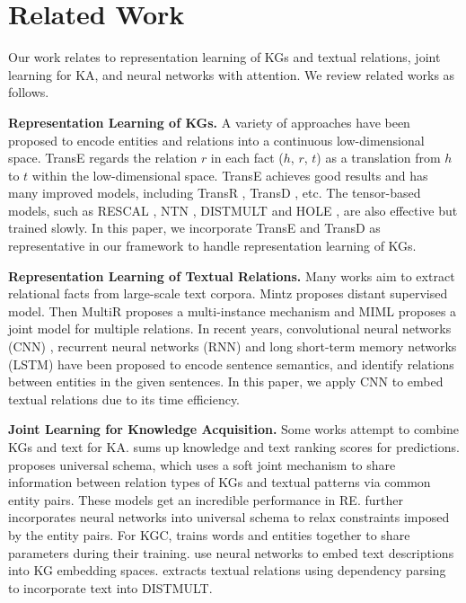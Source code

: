 \documentclass[letterpaper]{article} %
\begin{document}
\section{Related Work}
\label{sec:related}
Our work relates to representation learning of KGs and textual relations, joint learning for KA, and neural networks with attention. We review related works as follows.

\textbf{Representation Learning of KGs.} A variety of approaches have been proposed to encode entities and relations into a continuous low-dimensional space. TransE \cite{bordes2013translating} regards the relation $r$ in each fact ($h$, $r$, $t$) as a translation from $h$ to $t$ within the low-dimensional space. TransE achieves good results and has many improved models, including TransR \cite{lin2015learning}, TransD \cite{ji2015knowledge}, etc. The tensor-based models, such as RESCAL \cite{nickel2011three}, NTN \cite{socher2013reasoning}, DISTMULT \cite{yang2015embedding} and HOLE \cite{nickel2016holographic}, are also effective but trained slowly. In this paper, we incorporate TransE and TransD as representative in our framework to handle representation learning of KGs. 

\textbf{Representation Learning of Textual Relations.} Many works aim to extract relational facts from large-scale text corpora. Mintz \cite{mintz2009distant} proposes distant supervised model. Then MultiR \cite{hoffmann2011knowledge} proposes a multi-instance mechanism and MIML \cite{surdeanu2012multi} proposes a joint model for multiple relations. In recent years, convolutional neural networks (CNN) \cite{zeng2014relation,zeng2015distant}, recurrent neural networks (RNN) \cite{zhang2015relation} and long short-term memory networks (LSTM) \cite{xu2015classifying,miwa2016end} have been proposed to encode sentence semantics, and identify relations between entities in the given sentences. In this paper, we apply CNN to embed textual relations due to its time efficiency.



\textbf{Joint Learning for Knowledge Acquisition.} Some works attempt to combine KGs and text for KA. \cite{weston2013connecting} sums up knowledge and text ranking scores for predictions. \cite{riedel2013relation} proposes universal schema, which uses a soft joint mechanism to share information between relation types of KGs and textual patterns via common entity pairs. These models get an incredible performance in RE. \cite{vergaEtAl} further incorporates neural networks into universal schema to relax constraints imposed by the entity pairs. For KGC, \cite{wang2014knowledge} trains words and entities together to share parameters during their training. \cite{xie2016representation,wang2016text} use neural networks to embed text descriptions into KG embedding spaces. \cite{toutanova2015representing} extracts textual relations using dependency parsing to incorporate text into DISTMULT. 
\end{document}

